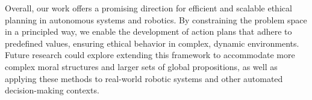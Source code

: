 \documentclass[]{jair}
\begin{document}
Overall, our work offers a promising direction for efficient and scalable ethical planning in autonomous systems and robotics. By constraining the problem space in a principled way, we enable the development of action plans that adhere to predefined values, ensuring ethical behavior in complex, dynamic environments. Future research could explore extending this framework to accommodate more complex moral structures and larger sets of global propositions, as well as applying these methods to real-world robotic systems and other automated decision-making contexts.



\printbibliography









\end{document}
